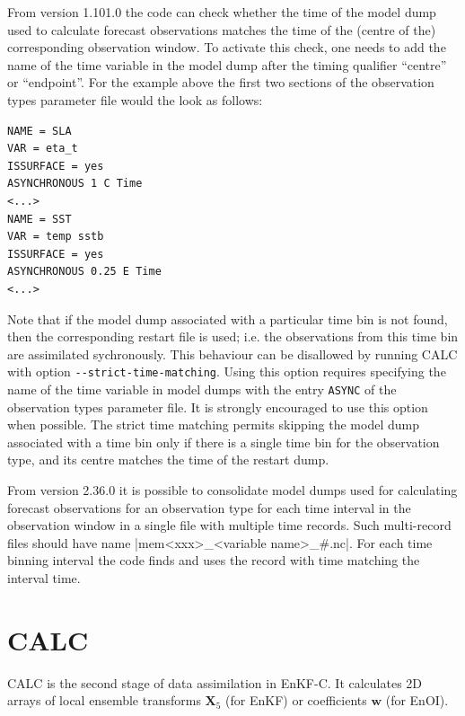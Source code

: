 \documentclass[11pt]{report}
\newcommand{\mb} {\mathbf}
\begin{document}
From version 1.101.0 the code can check whether the time of the model dump used to calculate forecast observations matches the time of the (centre of the) corresponding observation window.
To activate this check, one needs to add the name of the time variable in the model dump after the timing qualifier ``centre'' or ``endpoint''.
For the example above the first two sections of the observation types parameter file would the look as follows:
\begin{Verbatim}[frame=single,fontsize=\footnotesize]
NAME = SLA
VAR = eta_t
ISSURFACE = yes
ASYNCHRONOUS 1 C Time
<...>
NAME = SST
VAR = temp sstb
ISSURFACE = yes
ASYNCHRONOUS 0.25 E Time
<...>
\end{Verbatim}

Note that if the model dump associated with a particular time bin is not found, then the corresponding restart file is used; i.e. the observations from this time bin are assimilated sychronously.
This behaviour can be disallowed by running CALC with option \verb|--strict-time-matching|.
Using this option requires specifying the name of the time variable in model dumps with the entry \verb|ASYNC| of the observation types parameter file.
It is strongly encouraged to use this option when possible.
The strict time matching permits skipping the model dump associated with a time bin only if there is a single time bin for the observation type, and its centre matches the time of the restart dump.

From version 2.36.0 it is possible to consolidate model dumps used for calculating forecast observations for an observation type for each time interval in the observation window in a single file with multiple time records.
Such multi-record files should have name \spverb|mem<xxx>_<variable name>_#.nc|.
For each time binning interval the code finds and uses the record with time matching the interval time.

\section{CALC}

CALC is the second stage of data assimilation in EnKF-C.
It calculates 2D arrays of local ensemble transforms $\mb X_5$ (for EnKF) or coefficients $\mb w$ (for EnOI).
\end{document}
